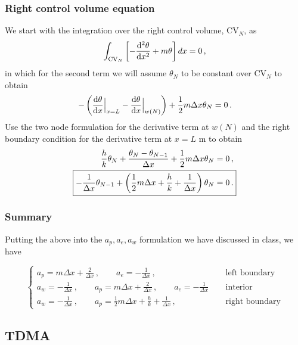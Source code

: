 \documentclass{article}
\begin{document}
\subsubsection*{Right control volume equation}

We start with the integration over the right control volume, CV$_N$, as
\[
	\int_{\text{CV}_N} \left[ -\dv{^2\theta}{x^2} + m \theta \right] dx = 0\,,
\]
in which for the second term we will assume $\theta_N$ to be constant over CV$_N$ to obtain
\[
	- \left( \dv{\theta}{x}\Big|_{x = L} - \dv{\theta}{x}\Big|_{w(N)} \right) + \frac{1}{2} m \Delta x \theta_N = 0\,.
\]
Use the two node formulation for the derivative term at $w(N)$ and the right boundary condition for the derivative term at $x = L$ m to obtain
\begin{align}
	\frac{h}{k} \theta_N + \frac{\theta_N - \theta_{N-1}}{\Delta x} + \frac{1}{2} m \Delta x \theta_N & = 0\,,\nonumber\\
	\Aboxed{- \frac{1}{\Delta x} \theta_{N-1} + \left(\frac{1}{2} m \Delta x + \frac{h}{k} + \frac{1}{\Delta x}\right) \theta_N & = 0\,.}
\end{align}

\subsubsection*{Summary}

Putting the above into the $a_p, a_e, a_w$ formulation we have discussed in class, we have

\[
	\begin{cases}
		a_p = m \Delta x + \frac{2}{\Delta x}\,, \qquad a_e = -\frac{1}{\Delta x}\,, & \text{left~boundary} \\
		a_w = - \frac{1}{\Delta x} \,, \qquad a_p = m \Delta x + \frac{2}{\Delta x}\,,\qquad a_e = -\frac{1}{\Delta x}\quad~ & \text{interior} \\
		a_w = - \frac{1}{\Delta x} \,, \qquad a_p = \frac{1}{2} m \Delta x + \frac{h}{k} + \frac{1}{\Delta x}\,, & \text{right~boundary}
	\end{cases}
\]
\subsection*{TDMA}
\end{document}
